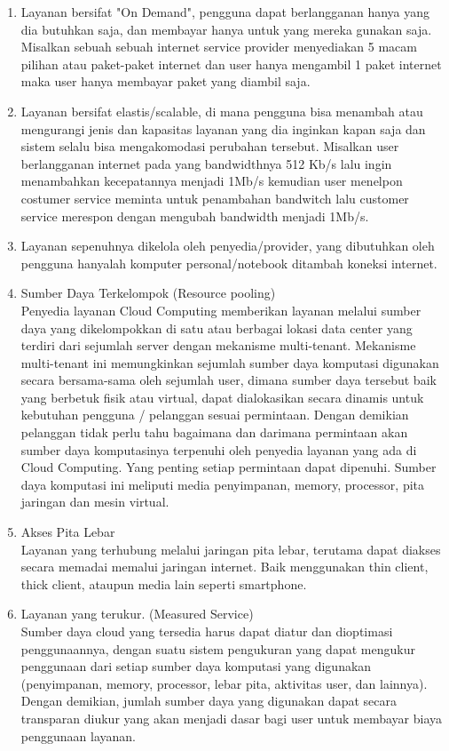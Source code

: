 \begin{enumerate}
\item Layanan bersifat "On Demand", pengguna dapat berlangganan hanya yang dia butuhkan saja, dan membayar hanya untuk yang mereka gunakan saja. Misalkan sebuah sebuah internet service provider menyediakan 5 macam pilihan atau paket-paket internet dan user hanya mengambil 1 paket internet maka user hanya membayar paket yang diambil saja.
\item Layanan bersifat elastis/scalable, di mana pengguna bisa menambah atau mengurangi jenis dan kapasitas layanan yang dia inginkan kapan saja dan sistem selalu bisa mengakomodasi perubahan tersebut. Misalkan user berlangganan internet pada yang bandwidthnya 512 Kb/s lalu ingin menambahkan kecepatannya menjadi 1Mb/s kemudian user menelpon costumer service meminta untuk penambahan bandwitch lalu customer service merespon dengan mengubah bandwidth menjadi 1Mb/s.
\item Layanan sepenuhnya dikelola oleh penyedia/provider, yang dibutuhkan oleh pengguna hanyalah komputer personal/notebook ditambah koneksi internet.
\item Sumber Daya Terkelompok (Resource pooling) \\Penyedia layanan Cloud Computing memberikan layanan melalui sumber daya yang dikelompokkan di satu atau berbagai lokasi data center yang terdiri dari sejumlah server dengan mekanisme multi-tenant. Mekanisme multi-tenant ini memungkinkan sejumlah sumber daya komputasi digunakan secara bersama-sama oleh sejumlah user, dimana sumber daya tersebut baik yang berbetuk fisik atau virtual, dapat dialokasikan secara dinamis untuk kebutuhan pengguna / pelanggan sesuai permintaan. Dengan demikian pelanggan tidak perlu tahu bagaimana dan darimana permintaan akan sumber daya komputasinya terpenuhi oleh penyedia layanan yang ada di Cloud Computing. Yang penting setiap permintaan dapat dipenuhi. Sumber daya komputasi ini meliputi media penyimpanan, memory, processor, pita jaringan dan mesin virtual.
\item Akses Pita Lebar \\Layanan yang terhubung melalui jaringan pita lebar, terutama dapat diakses secara memadai memalui jaringan internet. Baik menggunakan thin client, thick client, ataupun media lain seperti smartphone.
\item Layanan yang terukur. (Measured Service) \\Sumber daya cloud yang tersedia harus dapat diatur dan dioptimasi penggunaannya, dengan suatu sistem pengukuran yang dapat mengukur penggunaan dari setiap sumber
daya komputasi yang digunakan (penyimpanan, memory, processor, lebar pita, aktivitas user, dan lainnya). Dengan demikian, jumlah sumber daya yang digunakan dapat secara transparan diukur yang akan menjadi dasar bagi user untuk membayar biaya penggunaan layanan.
\end{enumerate}
